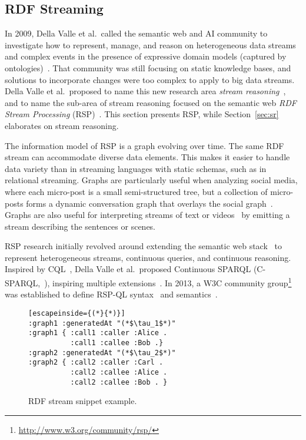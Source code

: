 \subsection{RDF Streaming}\label{sec:rdf} %

In 2009, Della Valle et al.\ called the semantic web and AI community
to investigate how to represent, manage, and reason on heterogeneous
data streams and complex events in the presence of expressive domain
models (captured by ontologies)~\cite{DBLP:journals/expert/ValleCHF09}.
That community was still focusing on static knowledge bases, and
solutions to incorporate changes were too complex to apply to big data
streams.  Della Valle et al.\ proposed to name this new research area
\emph{stream reasoning}~\cite{DellAglioDataScience2017}, and to name
the sub-area of stream reasoning focused on the semantic web \emph{RDF
  Stream Processing} (RSP)~\cite{DBLP:conf/debs/ValleDM16}. This
section presents RSP, while Section~\ref{sec:sr} elaborates on stream
reasoning.

The information model of RSP is a graph evolving over time. The same
RDF stream can accommodate diverse data elements. This makes it easier
to handle data variety than in streaming languages with static
schemas, such as in relational streaming.  Graphs are particularly
useful when analyzing social media, where each micro-post is a small
semi-structured tree, but a collection of micro-posts forms a dynamic
conversation graph that overlays the social
graph~\cite{DBLP:conf/semweb/BalduiniVDTPC13}. Graphs are also useful for
interpreting streams of text or
videos~\cite{DBLP:journals/semweb/GangemiPRNDM17} by emitting a stream
describing the sentences or scenes.

\sloppy RSP research initially revolved around extending the
semantic web stack~\cite{DBLP:books/daglib/0036180} to represent
heterogeneous streams, continuous queries, and continuous
reasoning. Inspired by CQL~\cite{arasu_widom_2004}, Della Valle et
al.\ proposed Continuous SPARQL
(\textsf{C-SPARQL},~\cite{DBLP:conf/fis/ValleCBBC08}), inspiring multiple
extensions~\cite{DBLP:journals/semweb/AnicicRFS12,Calbimonte2010,LePhuoc2012c}.
In 2013, a W3C community
group\footnote{\url{http://www.w3.org/community/rsp/}} was established
to define \textsf{RSP-QL} syntax~\cite{DBLP:conf/esws/DellAglioCVC15}
and semantics~\cite{DBLP:journals/ijswis/DellAglioVCC14}.

\begin{figure}[!h]
\begin{lstlisting}[escapeinside={(*}{*)}]
:graph1 :generatedAt "(*$\tau_1$*)"
:graph1 { :call1 :caller :Alice .
          :call1 :callee :Bob .}
:graph2 :generatedAt "(*$\tau_2$*)"
:graph2 { :call2 :caller :Carl .
          :call2 :callee :Alice .
          :call2 :callee :Bob . }
\end{lstlisting}
\vspace*{-4mm}
\caption{\label{fig:rdfstream}RDF stream snippet example.}
\end{figure}

